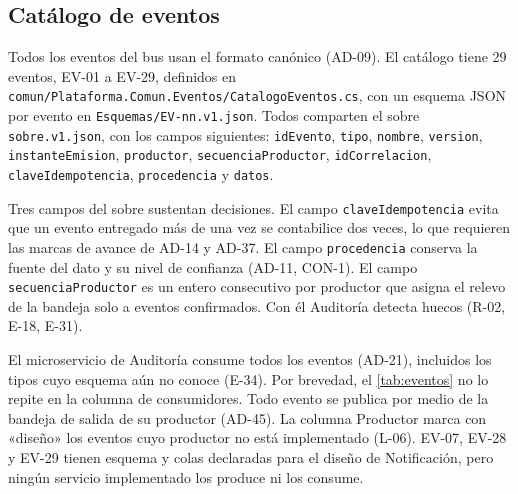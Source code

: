 \documentclass[11pt,letterpaper]{article}
\providecommand{\br}{\discretionary{}{}{}}
\begin{document}
\subsection{Catálogo de eventos}
\label{sec:eventos}

Todos los eventos del bus usan el formato canónico (AD-09). El catálogo tiene 29 eventos, EV-01 a
EV-29, definidos en \texttt{comun/\br{}Plataforma.\br{}Comun.\br{}Eventos/\br{}CatalogoEventos.\br{}cs}, con un esquema JSON
por evento en \texttt{Esquemas/\br{}EV-\br{}nn.\br{}v1.\br{}json}. Todos comparten el sobre \texttt{sobre.v1.json}, con
los campos siguientes: \texttt{idEvento}, \texttt{tipo}, \texttt{nombre}, \texttt{version},
\texttt{instanteEmision}, \texttt{productor}, \texttt{secuenciaProductor}, \texttt{idCorrelacion},
\texttt{claveIdempotencia}, \texttt{procedencia} y \texttt{datos}.

Tres campos del sobre sustentan decisiones. El campo \texttt{claveIdempotencia} evita que un evento
entregado más de una vez se contabilice dos veces, lo que requieren las marcas de avance de AD-14 y
AD-37. El campo \texttt{procedencia} conserva la fuente del dato y su nivel de confianza (AD-11,
CON-1). El campo \texttt{secuenciaProductor} es un entero consecutivo por productor que asigna el
relevo de la bandeja solo a eventos confirmados. Con él Auditoría detecta huecos (R-02, E-18,
E-31).

El microservicio de Auditoría consume todos los eventos (AD-21), incluidos los tipos cuyo esquema
aún no conoce (E-34). Por brevedad, el \cref{tab:eventos} no lo repite en la columna de
consumidores. Todo evento se publica por medio de la bandeja de salida de su productor (AD-45).
La columna Productor marca con «diseño» los eventos cuyo productor no está implementado (L-06).
EV-07, EV-28 y EV-29 tienen esquema y colas declaradas para el diseño de Notificación, pero ningún
servicio implementado los produce ni los consume.
\end{document}
